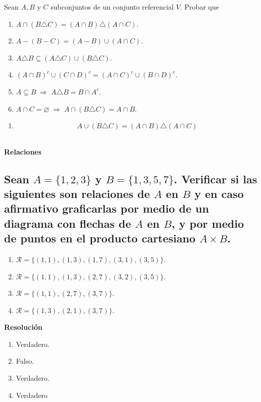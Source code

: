 \documentclass[11pt]{article}
\begin{document}
Sean $A, B$ y $C$ subconjuntos de un conjunto referencial $V$. Probar que

\begin{enumerate}
    \item $A \cap (B \triangle C) = (A \cap B) \triangle (A \cap C)$.
    \item $A - (B - C) = (A - B) \cup (A \cap C)$.
    \item $A \triangle B \subseteq (A \triangle C) \cup (B \triangle C)$.
    \item $(A \cap B)^{c} \cup (C \cap D)^{c} = (A \cap C)^{c} \cup (B \cap D)^{c}$.
    \item $A \subseteq B \;\Rightarrow\; A \triangle B = B \cap A^{c}$.
    \item $A \cap C = \varnothing \;\Rightarrow\; A \cap (B \triangle C) = A \cap B$.
\end{enumerate}

\begin{enumerate}
    \item \begin{align*}
        A \cup ( B \triangle C) = (A \cap B) \triangle (A \cap C)
    \end{align*}
\end{enumerate}
\subsection{}
\subsection{}

\textbf{Relaciones}
\subsection{Sean $A = \{1,2,3\}$ y $B = \{1,3,5,7\}$. Verificar si las siguientes son relaciones de $A$ en $B$ y en caso afirmativo graficarlas por medio de un diagrama con flechas de $A$ en $B$, y por medio de puntos en el producto cartesiano $A \times B$.}

\begin{enumerate}[label=\roman*)]
    \item $\mathcal{R} = \{(1,1), (1,3), (1,7), (3,1), (3,5)\}$.
    \item $\mathcal{R} = \{(1,1), (1,3), (2,7), (3,2), (3,5)\}$.
    \item $\mathcal{R} = \{(1,1), (2,7), (3,7)\}$.
    \item $\mathcal{R} = \{(1,3), (2,1), (3,7)\}$.
\end{enumerate}
\textbf{Resolución}
\begin{enumerate}[label=\roman*)]
    \item Verdadero. 
    \item Falso.
    \item Verdadero.
    \item Verdadero
\end{enumerate}
\end{document}
